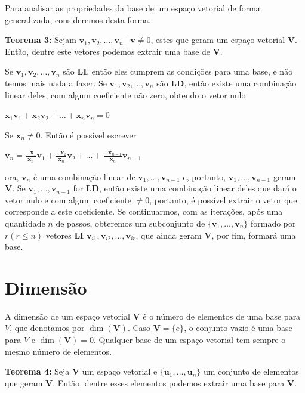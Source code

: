 Para analisar as propriedades da base de um espaço vetorial de forma generalizada, consideremos desta forma.

\noindent\textbf{Teorema 3:} Sejam $\mathbf{v}_1, \mathbf{v}_2, \ldots, \mathbf{v}_n \mid \mathbf{v} \neq 0$, estes que geram um espaço vetorial $\mathbf{V}$. Então, dentre este vetores podemos extrair uma base de $\mathbf{V}$.

Se $\mathbf{v}_1, \mathbf{v}_2, \ldots, \mathbf{v}_n$ são \textbf{LI}, então eles cumprem as condições para uma base, e não temos mais nada a fazer. Se $\mathbf{v}_1, \mathbf{v}_2, \ldots, \mathbf{v}_n$ são \textbf{LD}, então existe uma combinação linear deles, com algum coeficiente não zero, obtendo o vetor nulo

\centerline{$\mathbf{x}_1\mathbf{v}_1 + \mathbf{x}_2\mathbf{v}_2 + \ldots + \mathbf{x}_n\mathbf{v}_n = 0$}

Se $\mathbf{x}_n \neq 0$. Então é possível escrever

\centerline{$\mathbf{v}_n = \frac{-\mathbf{x}_1}{\mathbf{x}_n}\mathbf{v}_1 + \frac{-\mathbf{x}_2}{\mathbf{x}_n}\mathbf{v}_2 + \ldots + \frac{-\mathbf{x}_{n -1}}{\mathbf{x}_n}\mathbf{v}_{n -1}$}

ora, $\mathbf{v}_n$ é uma combinação linear de $\mathbf{v}_1, \ldots, \mathbf{v}_{n -1}$ e, portanto, $\mathbf{v}_1, \ldots, \mathbf{v}_{n -1}$ geram $\mathbf{V}$. Se $\mathbf{v}_1, \ldots, \mathbf{v}_{n -1}$ for \textbf{LD}, então existe uma combinação linear deles que dará o vetor nulo e com algum coeficiente $\neq 0$, portanto, é possível extrair o vetor que corresponde a este coeficiente. Se continuarmos, com as iterações, após uma quantidade $n$ de passos, obteremos um subconjunto de $\{\mathbf{v}_1, \ldots, \mathbf{v}_n\}$ formado por $r(r \leqslant n)$ vetores \textbf{LI} $\mathbf{v}_{i1}, \mathbf{v}_{i2}, \ldots, \mathbf{v}_{ir}$, que ainda geram $\mathbf{V}$, por fim, formará uma base.

\section{Dimensão}
A dimensão de um espaço vetorial $\mathbf{V}$ é o número de elementos de uma base para $V$, que denotamos por $\dim(\mathbf{V})$. Caso $\mathbf{V} = \{e\}$, o conjunto vazio é uma base para $V$ e $\dim(\mathbf{V}) = 0$. Qualquer base de um espaço vetorial tem sempre o mesmo número de elementos.

\noindent\textbf{Teorema 4:} Seja  $\mathbf{V}$ um espaço vetorial e $\{\mathbf{u}_1, \ldots, \mathbf{u}_n\}$ um conjunto de elementos que geram  $\mathbf{V}$. Então, dentre esses elementos podemos extrair uma base para $\mathbf{V}$.

